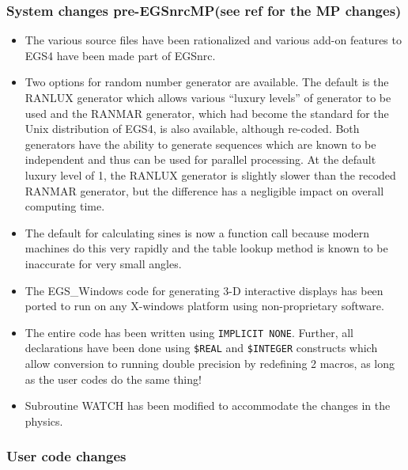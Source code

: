 \subsubsection[System changes]{System changes pre-EGSnrcMP(see
ref\cite{Ka03} for the MP changes)}
\begin{itemize} 

\item The various source files have been rationalized and various add-on
features to EGS4 have been made part of EGSnrc.

  
\item Two options for random number generator are available. The
default is the RANLUX generator which allows various ``luxury levels''
of generator to be used and the RANMAR generator, which had become the
standard for the Unix distribution of EGS4, is also available, although
re-coded.  Both generators have the ability to generate sequences which
are known to be independent and thus can be used for parallel processing.
At the default luxury level of 1, the RANLUX generator is slightly slower
than the recoded RANMAR generator, but the difference has a negligible
impact on overall computing time.

\item The default for calculating sines is now a function call because
modern machines do this very rapidly and the table lookup method is known
to be inaccurate for very small angles.

\item The EGS\_Windows code for generating  3-D interactive displays has
been ported to run on any X-windows platform using non-proprietary
software.

\item The entire code has been written using {\tt IMPLICIT NONE}. Further,
all declarations have been done using {\tt \$REAL} and {\tt \$INTEGER}
constructs which allow conversion to running double precision by redefining
2 macros, as long as the user codes  do the same thing!

\item Subroutine WATCH has been modified to accommodate the changes in the
physics.

\end{itemize} 

\subsubsection{User code changes}


